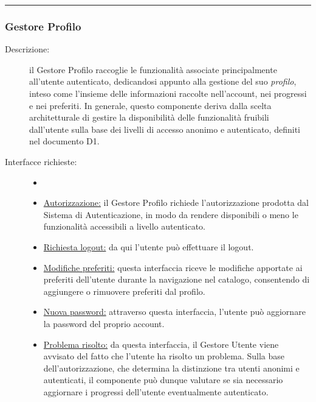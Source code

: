 \documentclass[11pt, a4paper]{article}
\theoremstyle{definition} %
\begin{document}
\begin{center}
    \rule{5cm}{1pt}
\end{center}

\subsubsection{Gestore Profilo}
\begin{description}
    \item[Descrizione:] il Gestore Profilo raccoglie le funzionalità
    associate principalmente all'utente autenticato, dedicandosi appunto alla
    gestione del suo \textit{profilo}, inteso come l'insieme delle informazioni
    raccolte nell'account, nei progressi e nei preferiti. In generale, questo
    componente deriva dalla scelta architetturale di gestire la disponibilità
    delle funzionalità fruibili dall'utente sulla base dei livelli di accesso
    anonimo e autenticato, definiti nel documento D1.

    \item[Interfacce richieste:]
    \begin{itemize}
        \item[]

        \item \underline{Autorizzazione:} il Gestore Profilo richiede l'autorizzazione
        prodotta dal Sistema di Autenticazione, in modo da rendere disponibili o
        meno le funzionalità accessibili a livello autenticato.

        \item \underline{Richiesta logout:} da qui l'utente può effettuare il logout.

        \item \underline{Modifiche preferiti:} questa interfaccia riceve le
        modifiche apportate ai preferiti dell'utente durante la navigazione
        nel catalogo, consentendo di aggiungere o rimuovere preferiti dal
        profilo.

        \item \underline{Nuova password:} attraverso questa interfaccia,
        l'utente può aggiornare la password del proprio account.

        \item \underline{Problema risolto:} da questa interfaccia, il Gestore
        Utente viene avvisato del fatto che l'utente ha risolto un problema.
        Sulla base dell'autorizzazione, che determina la distinzione tra
        utenti anonimi e autenticati, il componente può dunque valutare se
        sia necessario aggiornare i progressi dell'utente eventualmente autenticato.
    \end{itemize}


\end{description}
\end{document}
